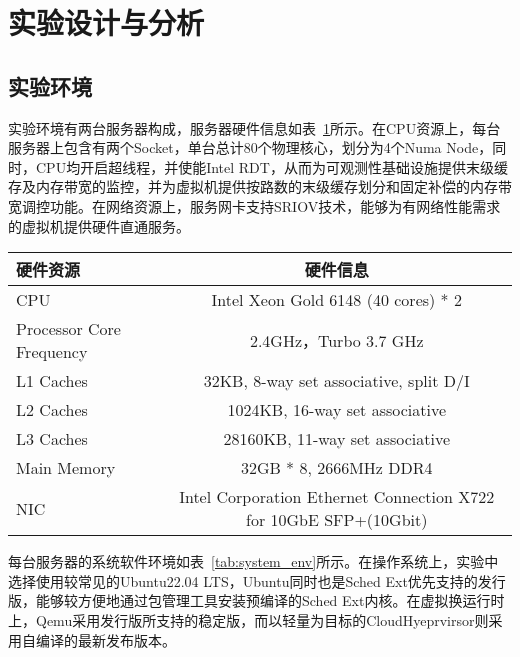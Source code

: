 
\section{实验设计与分析}

\subsection{实验环境}

实验环境有两台服务器构成，服务器硬件信息如表~\ref{tab:exp_env}所示。在CPU资源上，每台服务器上包含有两个Socket，单台总计80个物理核心，划分为4个Numa Node，同时，CPU均开启超线程，并使能Intel RDT，从而为可观测性基础设施提供末级缓存及内存带宽的监控，并为虚拟机提供按路数的末级缓存划分和固定补偿的内存带宽调控功能。在网络资源上，服务网卡支持SRIOV技术，能够为有网络性能需求的虚拟机提供硬件直通服务。

\begin{table}[H]
    \label{tab:exp_env}
    \footnotesize%
    \setlength{\tabcolsep}{4pt}%
    \renewcommand{\arraystretch}{1.5}%
    \centering
    \begin{tabular}{lc}
        \hline
        硬件资源 & 硬件信息 \\
        \hline
        CPU & Intel Xeon Gold 6148 (40 cores) * 2 \\
        Processor Core Frequency & 2.4GHz，Turbo 3.7 GHz \\
        L1 Caches & 32KB,  8-way set associative, split D/I \\
        L2 Caches & 1024KB, 16-way set associative \\
        L3 Caches & 28160KB, 11-way set associative \\
        Main Memory & 32GB * 8, 2666MHz DDR4 \\
        NIC & Intel Corporation Ethernet Connection X722 for 10GbE SFP+(10Gbit) \\
        \hline
    \end{tabular}
\end{table}

每台服务器的系统软件环境如表~\ref{tab:system_env}所示。在操作系统上，实验中选择使用较常见的Ubuntu22.04 LTS，Ubuntu同时也是Sched Ext优先支持的发行版，能够较方便地通过包管理工具安装预编译的Sched Ext内核。在虚拟换运行时上，Qemu采用发行版所支持的稳定版，而以轻量为目标的CloudHyeprvirsor则采用自编译的最新发布版本。

